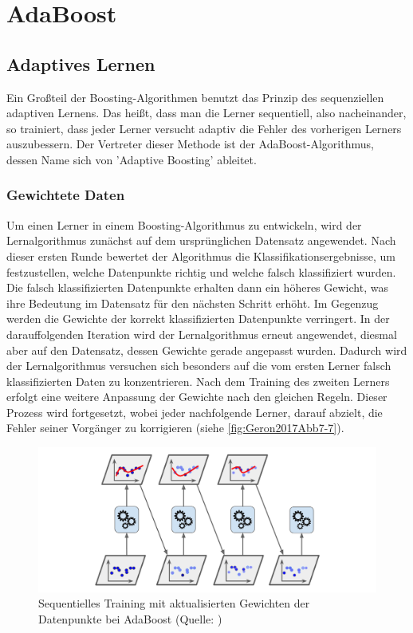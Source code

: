 \section{AdaBoost}
\subsection{Adaptives Lernen}
\label{sec:adaptive_learning}
Ein Großteil der Boosting-Algorithmen benutzt das Prinzip des sequenziellen adaptiven Lernens. Das heißt, dass man die Lerner sequentiell, also nacheinander, so trainiert, dass jeder Lerner versucht adaptiv die Fehler des vorherigen Lerners auszubessern.
\newline
Der Vertreter dieser Methode ist der AdaBoost-Algorithmus, dessen Name sich von 'Adaptive Boosting' ableitet.
\subsubsection{Gewichtete Daten}
Um einen Lerner in einem Boosting-Algorithmus zu entwickeln, wird der Lernalgorithmus zunächst auf dem ursprünglichen Datensatz angewendet. Nach dieser ersten Runde bewertet der Algorithmus die Klassifikationsergebnisse, um festzustellen, welche Datenpunkte richtig und welche falsch klassifiziert wurden. Die falsch klassifizierten Datenpunkte erhalten dann ein höheres Gewicht, was ihre Bedeutung im Datensatz für den nächsten Schritt erhöht. Im Gegenzug werden die Gewichte der korrekt klassifizierten Datenpunkte verringert.
\newline
In der darauffolgenden Iteration wird der Lernalgorithmus erneut angewendet, diesmal aber auf den Datensatz, dessen Gewichte gerade angepasst wurden. Dadurch wird der Lernalgorithmus versuchen sich besonders auf die vom ersten Lerner falsch klassifizierten Daten zu konzentrieren. Nach dem Training des zweiten Lerners erfolgt eine weitere Anpassung der Gewichte nach den gleichen Regeln.
\newline
Dieser Prozess wird fortgesetzt, wobei jeder nachfolgende Lerner, darauf abzielt, die Fehler seiner Vorgänger zu korrigieren (siehe \autoref{fig:Geron2017Abb7-7}).

\begin{figure}[h]
    \centering
    \includegraphics[width=\linewidth]{Images/Geron2017Abb7-7.png}
    \caption[Sequentielles Training mit aktualisierten Gewichten der Datenpunkte bei AdaBoost]{Sequentielles Training mit aktualisierten Gewichten der Datenpunkte bei AdaBoost (Quelle: \textcite[Abbildung 7-7][S.~192]{Geron2018})}
    \label{fig:Geron2017Abb7-7}
\end{figure}


